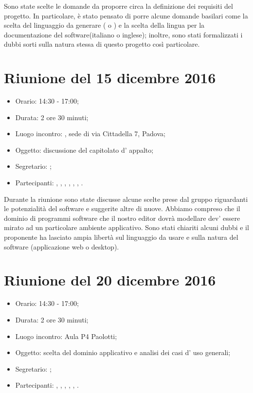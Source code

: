 Sono state scelte le domande da proporre circa la definizione dei requisiti del progetto. In particolare, è stato pensato di porre alcune domande basilari come la scelta del linguaggio da generare ( o ) e la scelta della lingua per la documentazione del software(italiano o inglese); inoltre, sono stati formalizzati i dubbi sorti sulla natura stessa di questo progetto così particolare.



\section{Riunione del 15 dicembre 2016}

\begin{itemize}
	\item Orario: 14:30 - 17:00;
	\item Durata: 2 ore 30 minuti;
	\item Luogo incontro: \ZU, sede di via Cittadella 7, Padova; 
	\item Oggetto: discussione del capitolato d' appalto;
	\item Segretario: \LS; 
	\item Partecipanti: \GP, \AZ, \GG, \LB, \LS, \MM, \PB.
\end{itemize}

Durante la riunione sono state discusse alcune scelte prese dal gruppo riguardanti le potenzialità del software e suggerite altre di nuove. Abbiamo compreso che il dominio di programmi software che il nostro editor dovrà modellare dev' essere mirato ad un particolare ambiente applicativo. Sono stati chiariti alcuni dubbi e il proponente ha lasciato ampia libertà sul linguaggio da usare e sulla natura del software (applicazione web o desktop).



\section{Riunione del 20 dicembre 2016}

\begin{itemize}
	\item Orario: 14:30 - 17:00;
	\item Durata: 2 ore 30 minuti;
	\item Luogo incontro: Aula P4 Paolotti; 
	\item Oggetto: scelta del dominio applicativo e analisi dei casi d' uso generali;
	\item Segretario: \PB; 
	\item Partecipanti: \AZ, \GG, \LB, \LS, \MM, \PB.
\end{itemize}

